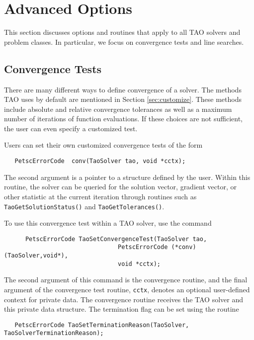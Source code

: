 
\chapter{Advanced Options}

This section discusses options and routines that apply to all TAO
solvers and problem classes.  In particular, we focus on
convergence tests and line searches.



\section{Convergence Tests}
\label{sec:Taoconvergence}

There are many different ways to define convergence of a solver.
The methods TAO uses by default are mentioned in 
Section \ref{sec:customize}.
These methods include absolute and relative convergence tolerances as well
as a maximum number of iterations of function evaluations.
If these choices are not sufficient, 
the user can even specify a customized test. 

Users can set their own customized convergence tests of the form
\begin{verbatim}
   PetscErrorCode  conv(TaoSolver tao, void *cctx);
\end{verbatim}
\noindent
The second argument
is a pointer to a structure defined by the user.
Within this routine, the solver
can be queried for the solution vector, gradient vector,
or other statistic at the current iteration through routines such as
{\tt TaoGetSolutionStatus()} and  {\tt TaoGetTolerances()}.

To use this convergence test within a TAO solver, use
the command 
\begin{verbatim}
      PetscErrorCode TaoSetConvergenceTest(TaoSolver tao,
                                PetscErrorCode (*conv)(TaoSolver,void*),
                                void *cctx);
\end{verbatim}
\noindent
The second argument of this command is the convergence routine, and the
final argument of the convergence test routine, {\tt cctx},
denotes an optional user-defined context for private data.  
The convergence routine receives the TAO solver and this private data
structure. 
The termination flag can be set using the routine
\begin{verbatim}
   PetscErrorCode TaoSetTerminationReason(TaoSolver, TaoSolverTerminationReason);
\end{verbatim}
\noindent




